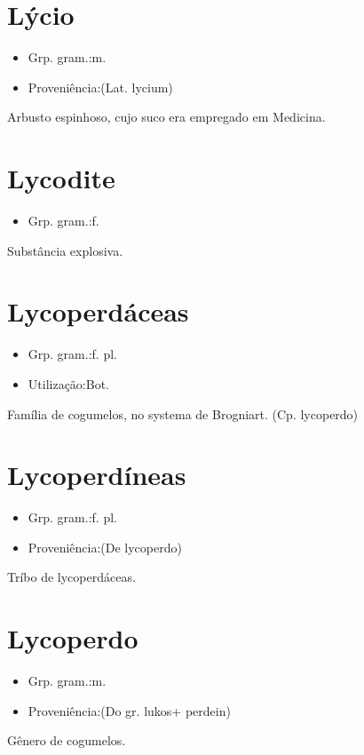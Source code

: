 \section{Lýcio}
\begin{itemize}
\item {Grp. gram.:m.}
\end{itemize}
\begin{itemize}
\item {Proveniência:(Lat. \textunderscore lycium\textunderscore )}
\end{itemize}
Arbusto espinhoso, cujo suco era empregado em Medicina.
\section{Lycodite}
\begin{itemize}
\item {Grp. gram.:f.}
\end{itemize}
Substância explosiva.
\section{Lycoperdáceas}
\begin{itemize}
\item {Grp. gram.:f. pl.}
\end{itemize}
\begin{itemize}
\item {Utilização:Bot.}
\end{itemize}
Família de cogumelos, no systema de Brogniart.
(Cp. \textunderscore lycoperdo\textunderscore )
\section{Lycoperdíneas}
\begin{itemize}
\item {Grp. gram.:f. pl.}
\end{itemize}
\begin{itemize}
\item {Proveniência:(De \textunderscore lycoperdo\textunderscore )}
\end{itemize}
Tríbo de lycoperdáceas.
\section{Lycoperdo}
\begin{itemize}
\item {Grp. gram.:m.}
\end{itemize}
\begin{itemize}
\item {Proveniência:(Do gr. \textunderscore lukos\textunderscore  + \textunderscore perdein\textunderscore )}
\end{itemize}
Gênero de cogumelos.
